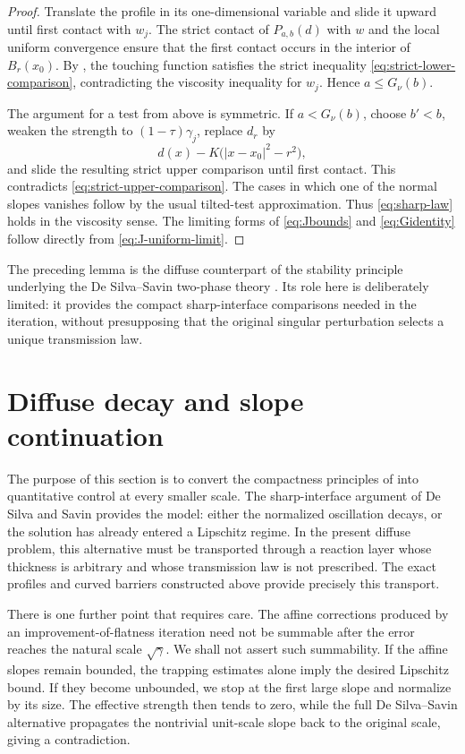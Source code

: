 \documentclass[11pt,letterpaper]{amsart}
\numberwithin{equation}{section}
\theoremstyle{definition}
\theoremstyle{remark}
\begin{document}
\begin{proof}
Translate the profile in its one-dimensional variable and slide it upward
until first contact with $w_j$. The strict contact of $P_{a,b}(d)$ with $w$
and the local uniform convergence ensure that the first contact occurs in
the interior of $B_r(x_0)$. By
, the touching function satisfies the strict
inequality \eqref{eq:strict-lower-comparison}, contradicting the viscosity
inequality for $w_j$. Hence $a\leq G_\nu(b)$.

The argument for a test from above is symmetric. If
$a<G_\nu(b)$, choose $b'<b$, weaken the strength to
$(1-\tau)\gamma_j$, replace $d_r$ by
$$
d(x)-K\bigl(|x-x_0|^2-r^2\bigr),
$$
and slide the resulting strict upper comparison until first contact. This
contradicts \eqref{eq:strict-upper-comparison}. The cases in which one of the
normal slopes vanishes follow by the usual tilted-test approximation. Thus
\eqref{eq:sharp-law} holds in the viscosity sense. The limiting forms of
\eqref{eq:Jbounds} and \eqref{eq:Gidentity} follow directly from
\eqref{eq:J-uniform-limit}.
\end{proof}

The preceding lemma is the diffuse counterpart of the stability principle
underlying the De Silva--Savin two-phase theory \cite{DeSilvaSavin}. Its role
here is deliberately limited: it provides the compact sharp-interface
comparisons needed in the iteration, without presupposing that the original
singular perturbation selects a unique transmission law.


\section{Diffuse decay and slope continuation}
\label{sec:diffuse-continuation}

The purpose of this section is to convert the compactness principles of
 into quantitative control at every smaller
scale. The sharp-interface argument of De Silva and Savin provides the
model: either the normalized oscillation decays, or the solution has already
entered a Lipschitz regime. In the present diffuse problem, this alternative
must be transported through a reaction layer whose thickness is arbitrary
and whose transmission law is not prescribed. The exact profiles and curved
barriers constructed above provide precisely this transport.

There is one further point that requires care. The affine corrections
produced by an improvement-of-flatness iteration need not be summable after
the error reaches the natural scale $\sqrt\gamma$. We shall not assert such
summability. If the affine slopes remain bounded, the trapping estimates
alone imply the desired Lipschitz bound. If they become unbounded, we stop at
the first large slope and normalize by its size. The effective strength then
tends to zero, while the full De Silva--Savin alternative propagates the
nontrivial unit-scale slope back to the original scale, giving a
contradiction.
\end{document}

